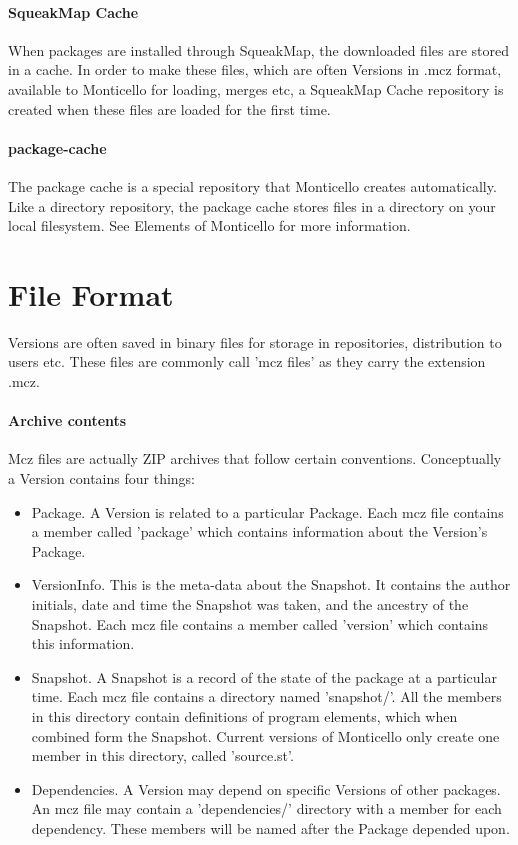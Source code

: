 \documentclass[a4paper,10pt,twoside]{book}
\begin{document}
\paragraph{SqueakMap Cache}

When packages are installed through SqueakMap, the downloaded files are stored in a cache. In order to make these files, which are often Versions in .mcz format, available to Monticello for loading, merges etc, a SqueakMap Cache repository is created when these files are loaded for the first time.

\paragraph{package-cache}

The package cache is a special repository that Monticello creates automatically. Like a directory repository, the package cache stores files in a directory on your local filesystem. See Elements of Monticello for more information.


\section{File Format}

Versions are often saved in binary files for storage in repositories, distribution to users etc. These files are commonly call 'mcz files' as they carry the extension .mcz.

\paragraph{Archive contents}

Mcz files are actually ZIP archives that follow certain conventions. Conceptually a Version contains four things:

\begin{itemize}
\item Package. A Version is related to a particular Package. Each mcz file contains a member called 'package' which contains information about the Version's Package.

\item VersionInfo. This is the meta-data about the Snapshot. It contains the author initials, date and time the Snapshot was taken, and the ancestry of the Snapshot. Each mcz file contains a member called 'version' which contains this information.
\item Snapshot. A Snapshot is a record of the state of the package at a particular time. Each mcz file contains a directory named 'snapshot/'. All the members in this directory contain definitions of program elements, which when combined form the Snapshot. Current versions of Monticello only create one member in this directory, called 'source.st'.
\item Dependencies. A Version may depend on specific Versions of other packages. An mcz file may contain a 'dependencies/' directory with a member for each dependency. These members will be named after the Package depended upon.
\end{itemize}
\end{document}
